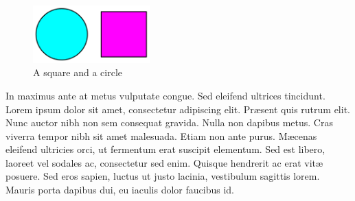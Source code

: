 \begin{figure}
  \centering
  \includegraphics[width=0.4\textwidth]{fig/square-circle}
  \caption{A square and a circle}
  \label{fig:square-circle}
\end{figure}

In maximus ante at metus vulputate congue. Sed eleifend ultrices tincidunt. Lorem ipsum dolor sit amet, consectetur adipiscing elit. Pr\ae{}sent quis rutrum elit. Nunc auctor nibh non sem consequat gravida. Nulla non dapibus metus. Cras viverra tempor nibh sit amet malesuada. Etiam non ante purus. M\ae{}cenas eleifend ultricies orci, ut fermentum erat suscipit elementum. Sed est libero, laoreet vel sodales ac, consectetur sed enim. Quisque hendrerit ac erat vit\ae{} posuere. Sed eros sapien, luctus ut justo lacinia, vestibulum sagittis lorem. Mauris porta dapibus dui, eu iaculis dolor faucibus id. 


%

%
%



